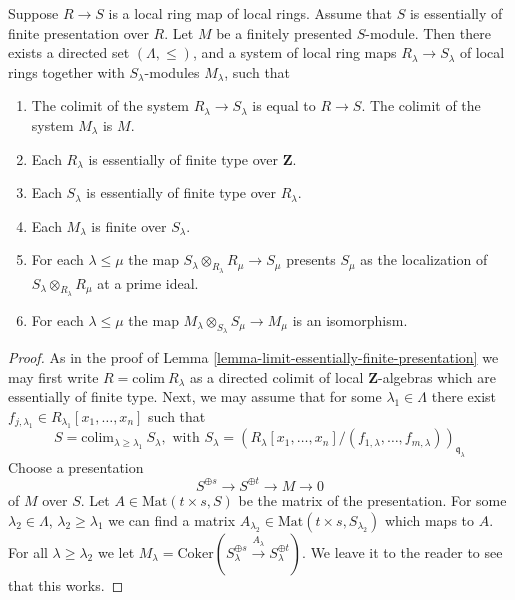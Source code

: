 \begin{lemma}
\label{lemma-limit-module-essentially-finite-presentation}
Suppose $R \to S$ is a local ring map of local rings.
Assume that $S$ is essentially of finite presentation over $R$.
Let $M$ be a finitely presented $S$-module.
Then there exists a directed set $(\Lambda, \leq)$, and
a system of local ring maps $R_\lambda \to S_\lambda$
of local rings together with $S_\lambda$-modules $M_\lambda$,
such that
\begin{enumerate}
\item The colimit of the system $R_\lambda \to S_\lambda$
is equal to $R \to S$. The colimit of the system $M_\lambda$
is $M$.
\item Each $R_\lambda$ is essentially of finite type
over $\mathbf{Z}$.
\item Each $S_\lambda$ is essentially of finite type
over $R_\lambda$.
\item Each $M_\lambda$ is finite over $S_\lambda$.
\item For each $\lambda \leq \mu$ the map
$S_\lambda \otimes_{R_\lambda} R_\mu \to S_\mu$
presents $S_\mu$ as the localization of
$S_\lambda \otimes_{R_\lambda} R_\mu$
at a prime ideal.
\item For each $\lambda \leq \mu$ the map
$M_\lambda \otimes_{S_\lambda} S_\mu \to M_\mu$
is an isomorphism.
\end{enumerate}
\end{lemma}

\begin{proof}
As in the proof of Lemma \ref{lemma-limit-essentially-finite-presentation}
we may first write $R = \text{colim}\ R_\lambda$ as a directed colimit
of local $\mathbf{Z}$-algebras which are essentially of finite type.
Next, we may assume that for some $\lambda_1 \in \Lambda$ there
exist $f_{j, \lambda_1} \in R_{\lambda_1}[x_1, \ldots, x_n]$
such that
$$
S =
\text{colim}_{\lambda \geq \lambda_1}\ S_\lambda, \text{ with }
S_\lambda =
(R_\lambda[x_1, \ldots, x_n]/
(f_{1, \lambda}, \ldots, f_{m, \lambda}))_{\mathfrak q_\lambda}
$$
Choose a presentation
$$
S^{\oplus s} \to S^{\oplus t} \to M \to 0
$$
of $M$ over $S$. Let $A \in \text{Mat}(t\times s, S)$ be
the matrix of the presentation. For some $\lambda_2 \in \Lambda$,
$\lambda_2 \geq \lambda_1$
we can find a matrix $A_{\lambda_2} \in \text{Mat}(t\times s, S_{\lambda_2})$
which maps to $A$. For all $\lambda \geq \lambda_2$ we let
$M_\lambda = \text{Coker}(S_\lambda^{\oplus s} \xrightarrow{A_\lambda}
S_\lambda^{\oplus t})$. We leave it to the reader to see that
this works.
\end{proof}

